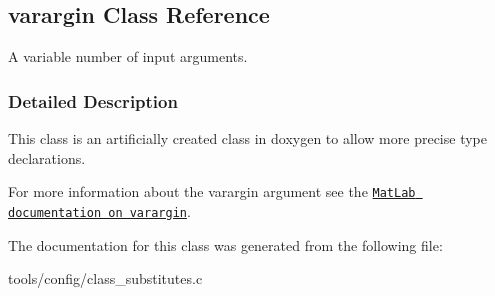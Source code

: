 \hypertarget{classvarargin}{}\subsection{varargin Class Reference}
\label{classvarargin}


A variable number of input arguments.  




\subsubsection{Detailed Description}
This class is an artificially created class in doxygen to allow more precise type declarations.

For more information about the varargin argument see the \href{http://www.mathworks.de/help/techdoc/ref/varargin.html}{\tt Mat\+Lab documentation on varargin}. 

The documentation for this class was generated from the following file\+:\begin{DoxyCompactItemize}
\item 
tools/config/class\+\_\+substitutes.\+c\end{DoxyCompactItemize}
